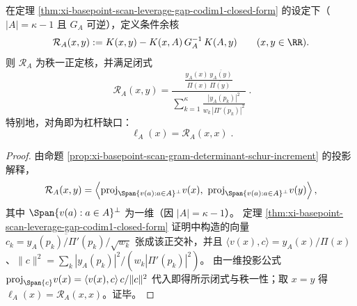 \begin{proposition}[余维一锚定的条件余核：秩一闭式与 \texorpdfstring{$\ell_A=\mathcal{R}_A(\cdot,\cdot)$}{ellA=residual}]\label{prop:xi-basepoint-scan-residual-kernel-codim1-rankone}
在定理 \ref{thm:xi-basepoint-scan-leverage-gap-codim1-closed-form} 的设定下（\(|A|=\kappa-1\) 且 \(G_A\) 可逆），定义条件余核
\[
\mathcal{R}_A(x,y):=K(x,y)-K(x,A)\,G_A^{-1}\,K(A,y)\qquad(x,y\in\RR).
\]
则 \(\mathcal{R}_A\) 为秩一正定核，并满足闭式
\[
\boxed{\;
\mathcal{R}_A(x,y)
=
\frac{\displaystyle \frac{y_A(x)\,\overline{y_A(y)}}{\Pi(x)\,\overline{\Pi(y)}}}{
\displaystyle \sum_{k=1}^{\kappa}\frac{|y_A(p_k)|^2}{w_k\,|\Pi'(p_k)|^2}
}\; }.
\]
特别地，对角即为杠杆缺口：
\[
\boxed{\;\ell_A(x)=\mathcal{R}_A(x,x)\; }.
\]
\end{proposition}
\begin{proof}
由命题 \ref{prop:xi-basepoint-scan-gram-determinant-schur-increment} 的投影解释，
\[
\mathcal{R}_A(x,y)=\left\langle \mathrm{proj}_{\Span\{v(a):a\in A\}^\perp}v(x),\ \mathrm{proj}_{\Span\{v(a):a\in A\}^\perp}v(y)\right\rangle,
\]
其中 \(\Span\{v(a):a\in A\}^\perp\) 为一维（因 \(|A|=\kappa-1\)）。
定理 \ref{thm:xi-basepoint-scan-leverage-gap-codim1-closed-form} 证明中构造的向量
\(
c_k=\overline{y_A(p_k)/\Pi'(p_k)}/\sqrt{w_k}
\)
张成该正交补，并且 \(\langle v(x),c\rangle=y_A(x)/\Pi(x)\)、\(\|c\|^2=\sum_k |y_A(p_k)|^2/(w_k|\Pi'(p_k)|^2)\)。
由一维投影公式
\(
\mathrm{proj}_{\Span\{c\}}v(x)=\langle v(x),c\rangle\,c/\|c\|^2
\)
代入即得所示闭式与秩一性；取 \(x=y\) 得 \(\ell_A(x)=\mathcal{R}_A(x,x)\)。证毕。
\end{proof}

